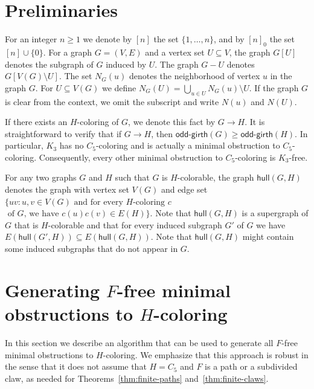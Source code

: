 \documentclass[11pt,a4paper]{article}
\theoremstyle{mystyle}
\newcommand{\hull}{\mathsf{hull}}
\begin{document}
\section{Preliminaries}\label{sec:prelim}
For an integer $n \geq 1$ we denote by $[n]$ the set $\{1,\ldots,n\}$, and by $[n]_0$ the set $[n] \cup \{0\}$.
For a graph $G=(V,E)$ and a vertex set $U \subseteq V$, the graph $G[U]$ denotes the subgraph of $G$ induced by $U$.
The graph $G-U$ denotes $G[V(G) \setminus U]$.
The set $N_G(u)$ denotes the neighborhood of vertex $u$ in the graph $G$.
For $U \subseteq V(G)$ we define $N_G(U)=\bigcup_{u \in U}N_G(u) \setminus U$.
If the graph $G$ is clear from the context, we omit the subscript and write $N(u)$ and $N(U)$.

If there exists an $H$-coloring of $G$, we denote this fact by $G \to H$. 
It is straightforward to verify that if $G \to H$, then $\textsf{odd-girth}(G) \geq \textsf{odd-girth}(H)$. In particular, $K_3$ has no $C_5$-coloring and is actually a minimal obstruction to $C_5$-coloring. Consequently, every other minimal obstruction to $C_5$-coloring is $K_3$-free.

For any two graphs $G$ and $H$ such that $G$ is $H$-colorable, the graph $\hull(G,H)$ denotes the graph with vertex set $V(G)$ and edge set $\{uv : u, v \in V(G)\text{ and for every } H\text{-coloring }c$ $\text{ of }G \text{, we have }c(u)c(v) \in E(H)\}$. Note that $\hull(G,H)$ is a supergraph of $G$ that is $H$-colorable and that for every induced subgraph $G'$ of $G$ we have $E(\hull(G',H)) \subseteq E(\hull(G,H))$. Note that $\hull(G,H)$ might contain some induced subgraphs that do not appear in $G$.

\section{Generating $F$-free minimal obstructions to $H$-coloring}\label{sec:algo}

In this section we describe an algorithm that can be used to generate all $F$-free minimal obstructions to $H$-coloring.
We emphasize that this approach is robust in the sense that it does not assume that $H=C_5$ and $F$ is a path or a subdivided claw, as needed for Theorems~\ref{thm:finite-paths} and~\ref{thm:finite-claws}.
\end{document}

